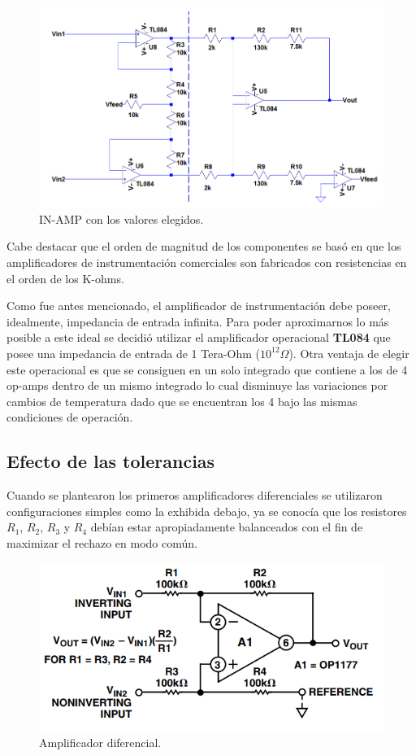 \begin{figure}[H]
	\centering
	\includegraphics[width=\linewidth]{./ImagenesVarias/IN-AMP-CON-VALORES.png}
	\caption{IN-AMP con los valores elegidos.}
\end{figure}

  Cabe destacar que el orden de magnitud de los componentes se basó en que los amplificadores de instrumentación comerciales son fabricados con resistencias en el orden de los K-ohms.
  
  Como fue antes mencionado, el amplificador de instrumentación debe poseer, idealmente, impedancia de entrada infinita. Para poder aproximarnos lo más posible a este ideal se decidió utilizar el amplificador operacional \textbf{TL084} que posee una impedancia de entrada de 1 Tera-Ohm ($10^{12}\Omega$). Otra ventaja de elegir este operacional es que se consiguen en un solo integrado que contiene a los de 4 op-amps dentro de un mismo integrado lo cual disminuye las variaciones por cambios de temperatura dado que se encuentran los 4 bajo las mismas condiciones de operación.
  
\subsection{Efecto de las tolerancias}
Cuando se plantearon los primeros amplificadores diferenciales se utilizaron configuraciones simples como la exhibida debajo, ya se conocía que los resistores $R_1$, $R_2$, $R_3$ y $R_4$ debían estar apropiadamente balanceados con el fin de maximizar el rechazo en modo común. 
\begin{figure}[H]
	\centering
	\includegraphics[width=\linewidth]{./ImagenesVarias/AmplificadorDiferencial.PNG}
	\caption{Amplificador diferencial.}
\end{figure}  

